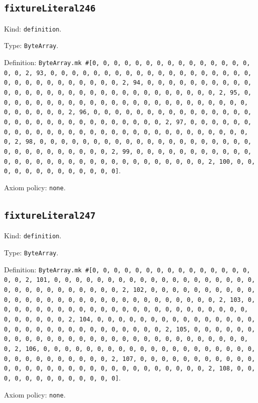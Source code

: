 \documentclass[11pt]{article}
\begin{document}
\subsection*{\texttt{fixtureLiteral246}}
\noindent Kind: \texttt{definition}.\par
\noindent Type: \texttt{ByteArray}.\par
\noindent Definition: \texttt{ByteArray.mk \#[0, 0, 0, 0, 0, 0, 0, 0, 0, 0, 0, 0, 0, 0, 0, 0, 0, 2, 93, 0, 0, 0, 0, 0, 0, 0, 0, 0, 0, 0, 0, 0, 0, 0, 0, 0, 0, 0, 0, 0, 0, 0, 0, 0, 0, 0, 0, 0, 0, 2, 94, 0, 0, 0, 0, 0, 0, 0, 0, 0, 0, 0, 0, 0, 0, 0, 0, 0, 0, 0, 0, 0, 0, 0, 0, 0, 0, 0, 0, 0, 0, 2, 95, 0, 0, 0, 0, 0, 0, 0, 0, 0, 0, 0, 0, 0, 0, 0, 0, 0, 0, 0, 0, 0, 0, 0, 0, 0, 0, 0, 0, 0, 0, 2, 96, 0, 0, 0, 0, 0, 0, 0, 0, 0, 0, 0, 0, 0, 0, 0, 0, 0, 0, 0, 0, 0, 0, 0, 0, 0, 0, 0, 0, 0, 0, 2, 97, 0, 0, 0, 0, 0, 0, 0, 0, 0, 0, 0, 0, 0, 0, 0, 0, 0, 0, 0, 0, 0, 0, 0, 0, 0, 0, 0, 0, 0, 0, 2, 98, 0, 0, 0, 0, 0, 0, 0, 0, 0, 0, 0, 0, 0, 0, 0, 0, 0, 0, 0, 0, 0, 0, 0, 0, 0, 0, 0, 0, 0, 0, 2, 99, 0, 0, 0, 0, 0, 0, 0, 0, 0, 0, 0, 0, 0, 0, 0, 0, 0, 0, 0, 0, 0, 0, 0, 0, 0, 0, 0, 0, 0, 0, 2, 100, 0, 0, 0, 0, 0, 0, 0, 0, 0, 0, 0, 0, 0]}.\par
\noindent Axiom policy: \texttt{none}.\par
\subsection*{\texttt{fixtureLiteral247}}
\noindent Kind: \texttt{definition}.\par
\noindent Type: \texttt{ByteArray}.\par
\noindent Definition: \texttt{ByteArray.mk \#[0, 0, 0, 0, 0, 0, 0, 0, 0, 0, 0, 0, 0, 0, 0, 0, 0, 2, 101, 0, 0, 0, 0, 0, 0, 0, 0, 0, 0, 0, 0, 0, 0, 0, 0, 0, 0, 0, 0, 0, 0, 0, 0, 0, 0, 0, 0, 0, 0, 2, 102, 0, 0, 0, 0, 0, 0, 0, 0, 0, 0, 0, 0, 0, 0, 0, 0, 0, 0, 0, 0, 0, 0, 0, 0, 0, 0, 0, 0, 0, 0, 2, 103, 0, 0, 0, 0, 0, 0, 0, 0, 0, 0, 0, 0, 0, 0, 0, 0, 0, 0, 0, 0, 0, 0, 0, 0, 0, 0, 0, 0, 0, 0, 2, 104, 0, 0, 0, 0, 0, 0, 0, 0, 0, 0, 0, 0, 0, 0, 0, 0, 0, 0, 0, 0, 0, 0, 0, 0, 0, 0, 0, 0, 0, 0, 2, 105, 0, 0, 0, 0, 0, 0, 0, 0, 0, 0, 0, 0, 0, 0, 0, 0, 0, 0, 0, 0, 0, 0, 0, 0, 0, 0, 0, 0, 0, 0, 2, 106, 0, 0, 0, 0, 0, 0, 0, 0, 0, 0, 0, 0, 0, 0, 0, 0, 0, 0, 0, 0, 0, 0, 0, 0, 0, 0, 0, 0, 0, 0, 2, 107, 0, 0, 0, 0, 0, 0, 0, 0, 0, 0, 0, 0, 0, 0, 0, 0, 0, 0, 0, 0, 0, 0, 0, 0, 0, 0, 0, 0, 0, 0, 2, 108, 0, 0, 0, 0, 0, 0, 0, 0, 0, 0, 0, 0, 0]}.\par
\noindent Axiom policy: \texttt{none}.\par
\end{document}
